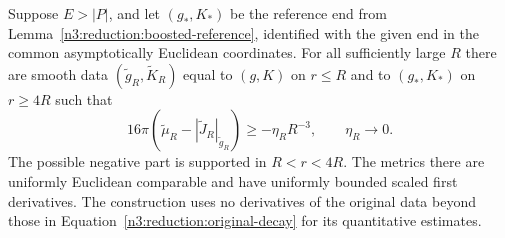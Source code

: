 \begin{proposition}
\label{n3:reduction:annular-replacement}
Suppose $E>|P|$, and let $(g_*,K_*)$ be the reference end from
Lemma~\ref{n3:reduction:boosted-reference}, identified with the given end
in the common asymptotically Euclidean coordinates.  For all sufficiently
large $R$ there are smooth data $(\widetilde g_R,\widetilde K_R)$ equal to
$(g,K)$ on $r\le R$ and to $(g_*,K_*)$ on $r\ge4R$ such that
\begin{equation}
 \label{n3:reduction:annular-deficit}
 16\pi(\widetilde\mu_R-|\widetilde J_R|_{\widetilde g_R})
       \ge-\eta_RR^{-3},\qquad \eta_R\longrightarrow0.
\end{equation}
The possible negative part is supported in $R<r<4R$.
The metrics there are uniformly Euclidean comparable and have uniformly
bounded scaled first derivatives.  The construction uses no derivatives
of the original data beyond those in
Equation~\eqref{n3:reduction:original-decay} for its quantitative estimates.
\end{proposition}

